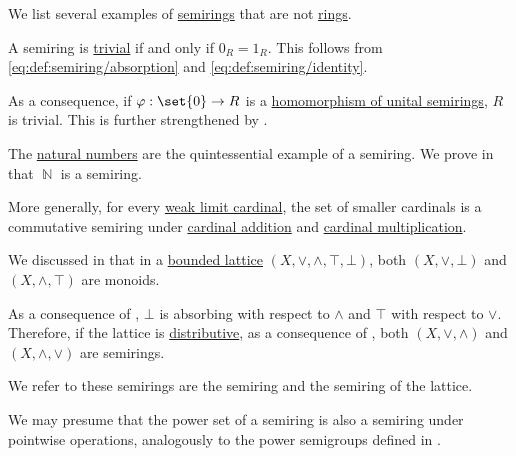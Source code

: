 \begin{example}\label{ex:def:semiring}
  We list several examples of \hyperref[def:semiring]{semirings} that are not \hyperref[def:ring]{rings}.

  \begin{thmenum}
     A semiring is \hyperref[def:semiring/trivial]{trivial} if and only if \( 0_R = 1_R \). This follows from \eqref{eq:def:semiring/absorption} and \eqref{eq:def:semiring/identity}.

    As a consequence, if \( \varphi: \set{ 0 } \to R \) is a \hyperref[def:semiring/homomorphism]{homomorphism of unital semirings}, \( R \) is trivial. This is further strengthened by .

     The \hyperref[def:natural_numbers]{natural numbers} are the quintessential example of a semiring. We prove in  that \( \BbbN \) is a semiring.

     More generally, for every \hyperref[def:successor_and_limit_cardinal/weak_limit]{weak limit cardinal}, the set of smaller cardinals is a commutative semiring under \hyperref[def:cardinal_arithmetic/addition]{cardinal addition} and \hyperref[def:cardinal_arithmetic/multiplication]{cardinal multiplication}.

     We discussed in  that in a \hyperref[def:extremal_points/bounds]{bounded lattice} \( (X, \vee, \wedge, \top, \bot) \), both \( (X, \vee, \bot) \) and \( (X, \wedge, \top) \) are monoids.

    As a consequence of , \( \bot \) is absorbing with respect to \( \wedge \) and \( \top \) with respect to \( \vee \). Therefore, if the lattice is \hyperref[def:distributive_lattice]{distributive}, as a consequence of , both \( (X, \vee, \wedge) \) and \( (X, \wedge, \vee) \) are semirings.

    We refer to these semirings are the  semiring and the  semiring of the lattice.

     We may presume that the power set of a semiring is also a semiring under pointwise operations, analogously to the power semigroups defined in .


\end{thmenum}
\end{example}
